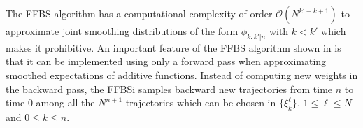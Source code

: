 \documentclass[12pt]{article}
\newcommand{\1}{\mathrm{1}}
\begin{document}
The FFBS algorithm has a computational complexity of order $\mathcal{O}(N^{k'-k+1})$ to approximate joint smoothing distributions of the form $\phi_{k:k'|n}$ with $k<k'$ which makes it prohibitive. An important feature of the FFBS algorithm shown in \cite{mongillo:deneve:2008,cappe:2011,delmoral:doucet:singh:2010} is that it can be implemented using only a forward pass when approximating smoothed expectations of additive functions. 
Instead of computing new weights in the backward pass, the FFBSi  samples backward new trajectories from time $n$ to time $0$ among all the $N^{n+1}$ trajectories which can be chosen in $\{\xi^{\ell}_k\}$, $1\le \ell\le N$ and $0\le k\le n$. 
\end{document}
